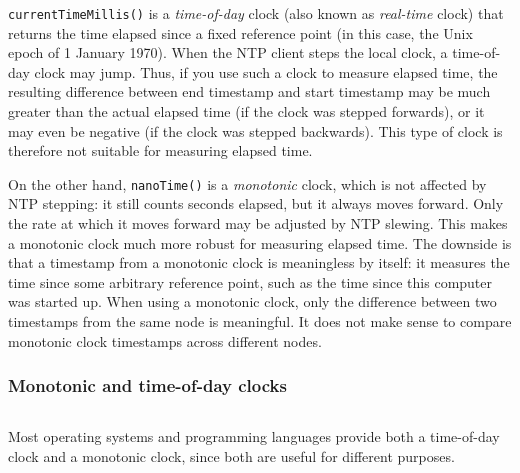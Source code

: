 \verb|currentTimeMillis()| is a \emph{time-of-day} clock (also known as \emph{real-time} clock) that returns the time elapsed since a fixed reference point (in this case, the Unix epoch of 1 January 1970).
When the NTP client steps the local clock, a time-of-day clock may jump.
Thus, if you use such a clock to measure elapsed time, the resulting difference between end timestamp and start timestamp may be much greater than the actual elapsed time (if the clock was stepped forwards), or it may even be negative (if the clock was stepped backwards).
This type of clock is therefore not suitable for measuring elapsed time.

On the other hand, \verb|nanoTime()| is a \emph{monotonic} clock, which is not affected by NTP stepping: it still counts seconds elapsed, but it always moves forward.
Only the rate at which it moves forward may be adjusted by NTP slewing.
This makes a monotonic clock much more robust for measuring elapsed time.
The downside is that a timestamp from a monotonic clock is meaningless by itself: it measures the time since some arbitrary reference point, such as the time since this computer was started up.
When using a monotonic clock, only the difference between two timestamps from the same node is meaningful.
It does not make sense to compare monotonic clock timestamps across different nodes.

\begin{frame}
    \label{s:monotonic-clock}
    \frametitle{Monotonic and time-of-day clocks}
    \inputminted{java}{code/nonmonotonic.java}
\end{frame}
\label{l:monotonic-clock}

Most operating systems and programming languages provide both a time-of-day clock and a monotonic clock, since both are useful for different purposes.


